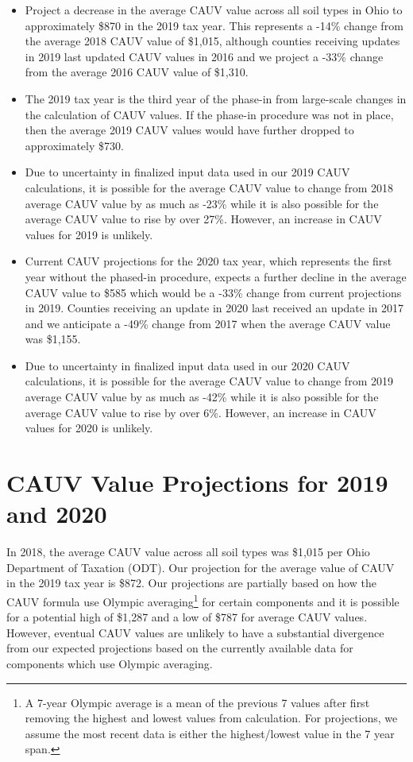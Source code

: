 \documentclass[]{article}
\providecommand{\tightlist}{%
  \setlength{\itemsep}{0pt}\setlength{\parskip}{0pt}}
\let\rmarkdownfootnote\footnote%
\def\footnote{\protect\rmarkdownfootnote}
\begin{document}
\begin{itemize}
\tightlist
\item
  Project a decrease in the average CAUV value across all soil types in
  Ohio to approximately \$870 in the 2019 tax year. This represents a
  -14\% change from the average 2018 CAUV value of \$1,015, although
  counties receiving updates in 2019 last updated CAUV values in 2016
  and we project a -33\% change from the average 2016 CAUV value of
  \$1,310.
\item
  The 2019 tax year is the third year of the phase-in from large-scale
  changes in the calculation of CAUV values. If the phase-in procedure
  was not in place, then the average 2019 CAUV values would have further
  dropped to approximately \$730.
\item
  Due to uncertainty in finalized input data used in our 2019 CAUV
  calculations, it is possible for the average CAUV value to change from
  2018 average CAUV value by as much as -23\% while it is also possible
  for the average CAUV value to rise by over 27\%. However, an increase
  in CAUV values for 2019 is unlikely.
\item
  Current CAUV projections for the 2020 tax year, which represents the
  first year without the phased-in procedure, expects a further decline
  in the average CAUV value to \$585 which would be a -33\% change from
  current projections in 2019. Counties receiving an update in 2020 last
  received an update in 2017 and we anticipate a -49\% change from 2017
  when the average CAUV value was \$1,155.
\item
  Due to uncertainty in finalized input data used in our 2020 CAUV
  calculations, it is possible for the average CAUV value to change from
  2019 average CAUV value by as much as -42\% while it is also possible
  for the average CAUV value to rise by over 6\%. However, an increase
  in CAUV values for 2020 is unlikely.
\end{itemize}

\newpage
{}

\hypertarget{cauv-value-projections-for-2019-and-2020}{%
\section{CAUV Value Projections for 2019 and
2020}\label{cauv-value-projections-for-2019-and-2020}}

In 2018, the average CAUV value across all soil types was \$1,015 per
Ohio Department of Taxation (ODT). Our projection for the average value
of CAUV in the 2019 tax year is \$872. Our projections are partially
based on how the CAUV formula use Olympic averaging\footnote{A 7-year
  Olympic average is a mean of the previous 7 values after first
  removing the highest and lowest values from calculation. For
  projections, we assume the most recent data is either the
  highest/lowest value in the 7 year span.} for certain components and
it is possible for a potential high of \$1,287 and a low of \$787 for
average CAUV values. However, eventual CAUV values are unlikely to have
a substantial divergence from our expected projections based on the
currently available data for components which use Olympic averaging.
\end{document}
